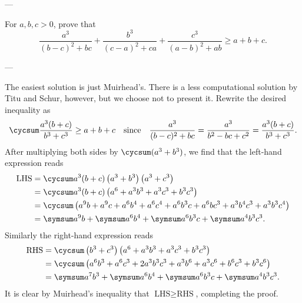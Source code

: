 
---

For $a,b,c>0$, prove that \[\frac{a^3}{(b-c)^2+bc}+\frac{b^3}{(c-a)^2+ca}+\frac{c^3}{(a-b)^2+ab}\ge a+b+c.\]

---

The easiest solution is just Muirhead's. There is a less computational solution by Titu and Schur, however, but we choose not to present it. Rewrite the desired inequality as \[\cycsum\frac{a^3(b+c)}{b^3+c^3}\ge a+b+c\quad\text{since}\quad\frac{a^3}{(b-c)^2+bc}=\frac{a^3}{b^2-bc+c^2}=\frac{a^3(b+c)}{b^3+c^3}.\]
After multiplying both sides by $\cycsum(a^3+b^3)$, we find that the left-hand expression reads
\begin{align*}
    \text{LHS}&=\cycsum a^3(b+c)\left(a^3+b^3\right)\left(a^3+c^3\right)\\
    &=\cycsum a^3(b+c)\left(a^6+a^3b^3+a^3c^3+b^3c^3\right)\\
    &=\cycsum\left(a^9b+a^9c+a^6b^4+a^6c^4+a^6b^3c+a^6bc^3+a^3b^4c^3+a^3b^3c^4\right)\\
    &=\symsum a^9b+\symsum a^6b^4+\symsum a^6b^3c+\symsum a^4b^3c^3.
\end{align*}
Similarly the right-hand expression reads
\begin{align*}
    \text{RHS}&=\cycsum\left(b^3+c^3\right)\left(a^6+a^3b^3+a^3c^3+b^3c^3\right)\\
    &=\cycsum\left(a^6b^3+a^6c^3+2a^3b^3c^3+a^3b^6+a^3c^6+b^6c^3+b^3c^6\right)\\
    &=\symsum a^7b^3+\symsum a^6b^4+\symsum a^6b^3c+\symsum a^4b^3c^3.
\end{align*}
It is clear by Muirhead's inequality that $\text{LHS}\ge\text{RHS}$, completing the proof.

